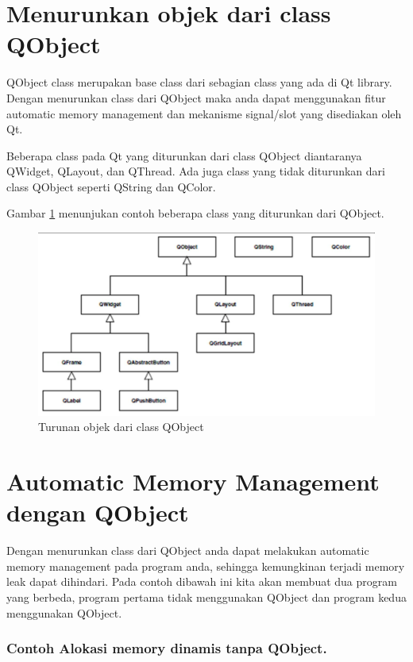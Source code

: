 \section{Menurunkan objek dari class QObject}\label{menurunkan-objek-dari-class-qobject}

QObject class merupakan base class dari sebagian class yang ada di Qt
library. Dengan menurunkan class dari QObject maka anda dapat
menggunakan fitur automatic memory management dan mekanisme signal/slot
yang disediakan oleh Qt.

Beberapa class pada Qt yang diturunkan dari class QObject diantaranya
QWidget, QLayout, dan QThread. Ada juga class yang tidak diturunkan dari
class QObject seperti QString dan QColor.

Gambar \ref{fig:qobjek} menunjukan contoh beberapa class yang diturunkan dari
QObject.

\begin{figure}
\centering
\includegraphics[width=0.9\linewidth]{images/Qobjek}
\caption{Turunan objek dari class QObject}
\label{fig:qobjek}
\end{figure}


\section{Automatic Memory Management dengan
QObject}\label{automatic-memory-management-dengan-qobject}

Dengan menurunkan class dari QObject anda dapat melakukan automatic
memory management pada program anda, sehingga kemungkinan terjadi memory
leak dapat dihindari. Pada contoh dibawah ini kita akan membuat dua
program yang berbeda, program pertama tidak menggunakan QObject dan
program kedua menggunakan QObject.

\subsubsection*{Contoh  Alokasi memory dinamis tanpa QObject.}

